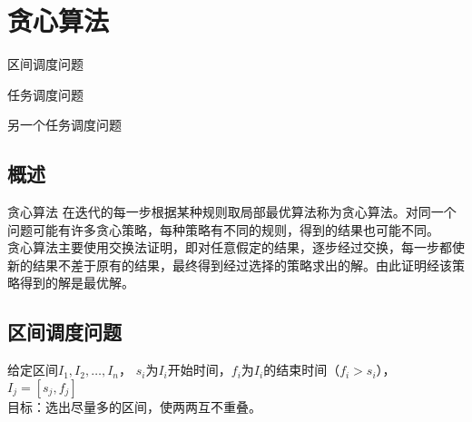 \chapter{贪心算法}

\begin{introduction}
	\item 区间调度问题
	\item 任务调度问题
	\item 另一个任务调度问题
\end{introduction}


\section{概述}
\begin{definition}{贪心算法}
    在迭代的每一步根据某种规则取局部最优算法称为贪心算法。对同一个问题可能有许多贪心策略，每种策略有不同的规则，得到的结果也可能不同。
    \\贪心算法主要使用交换法证明，即对任意假定的结果，逐步经过交换，每一步都使新的结果不差于原有的结果，最终得到经过选择的策略求出的解。由此证明经该策略得到的解是最优解。
\end{definition}



\section{区间调度问题}
\begin{example}
    给定区间$I_1, I_2, \ldots, I_n$，
	$s_i$为$I_i$开始时间，$f_i$为$I_i$的结束时间（$f_i>s_i$），$I_j=[s_j,f_j]$
	\\目标：选出尽量多的区间，使两两互不重叠。
\end{example}

